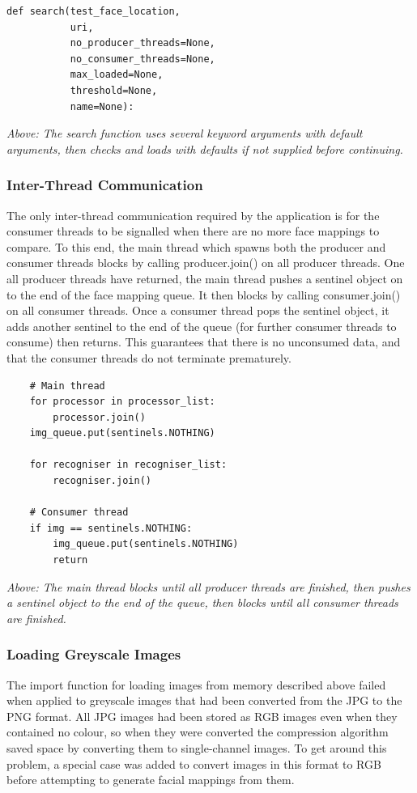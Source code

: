 \documentclass[12pt]{article}
\begin{document}
\begin{lstlisting}
def search(test_face_location,
           uri,
           no_producer_threads=None,
           no_consumer_threads=None,
           max_loaded=None,
           threshold=None,
           name=None):
\end{lstlisting}
\textit{Above: The search function uses several keyword arguments with default arguments, then checks and loads with defaults if not supplied before continuing.}

\subsubsection{Inter-Thread Communication}
The only inter-thread communication required by the application is for the consumer threads to be signalled when there are no more face mappings to compare. To this end, the main thread which spawns both the producer and consumer threads blocks by calling producer.join() on all producer threads. One all producer threads have returned, the main thread pushes a sentinel object on to the end of the face mapping queue. It then blocks by calling consumer.join() on all consumer threads. Once a consumer thread pops the sentinel object, it adds another sentinel to the end of the queue (for further consumer threads to consume) then returns. This guarantees that there is no unconsumed data, and that the consumer threads do not terminate prematurely.

\begin{lstlisting}
	# Main thread
    for processor in processor_list:
        processor.join()
    img_queue.put(sentinels.NOTHING)

    for recogniser in recogniser_list:
        recogniser.join()
        
    # Consumer thread
    if img == sentinels.NOTHING:
        img_queue.put(sentinels.NOTHING)
        return
\end{lstlisting}
\textit{Above: The main thread blocks until all producer threads are finished, then pushes a sentinel object to the end of the queue, then blocks until all consumer threads are finished.}

\subsubsection{Loading Greyscale Images}
The import function for loading images from memory described above failed when applied to greyscale images that had been converted from the JPG to the PNG format. All JPG images had been stored as RGB images even when they contained no colour, so when they were converted the compression algorithm saved space by converting them to single-channel images. To get around this problem, a special case was added to convert images in this format to RGB before attempting to generate facial mappings from them.
\end{document}

